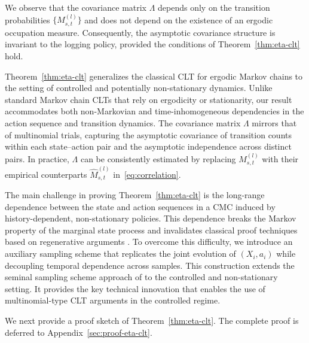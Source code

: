 \documentclass[twoside,11pt]{article}
\newcommand{\pow}[1]{^{(#1)}}%
\numberwithin{equation}{section}
\begin{document}
We observe that the covariance matrix $\Lambda$ depends only on the transition probabilities
$\{M_{s,t}^{(l)}\}$ and does not depend on the existence of an ergodic occupation
measure.
Consequently, the asymptotic covariance structure is invariant to the logging policy, provided the conditions of Theorem~\ref{thm:eta-clt} hold.

Theorem~\ref{thm:eta-clt} generalizes the classical CLT for ergodic Markov chains \citep{billingsley1961statistical} to the setting of controlled and potentially non-stationary dynamics. 
Unlike standard Markov chain CLTs that rely on ergodicity or stationarity, our result accommodates both non-Markovian and time-inhomogeneous dependencies in the action sequence and transition dynamics. 
The covariance matrix $\Lambda$ mirrors that of multinomial trials, capturing the asymptotic covariance of transition counts within each state–action pair and the asymptotic independence across distinct pairs. 
In practice, $\Lambda$ can be consistently estimated by replacing $M_{s,t}\pow l$ with their empirical counterparts $\hat M_{s,t}\pow l$ in~\cref{eq:correlation}.


The main challenge in proving Theorem~\ref{thm:eta-clt} is the long-range dependence between the state and action sequences in a CMC induced by history-dependent, non-stationary policies.
This dependence breaks the Markov property of the marginal state process and invalidates classical proof techniques based on regenerative arguments \citep{doeblin1938deux, dobrushin1956central, dobrushin1956centralII, nummelin1978splitting}. 
To overcome this difficulty, we introduce an auxiliary sampling scheme that replicates the joint evolution of $(X_i,a_i)$ while decoupling temporal dependence across samples.
This construction extends the seminal sampling scheme approach of \citet{billingsley1961statistical} to the controlled and non-stationary setting. 
It provides the key technical innovation that enables the use of multinomial-type CLT arguments in the controlled regime.

We next provide a proof sketch of Theorem~\ref{thm:eta-clt}. 
The complete proof is deferred to Appendix~\ref{sec:proof-eta-clt}.
\end{document}
